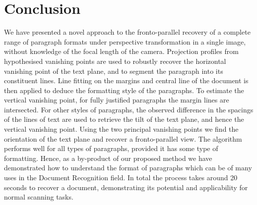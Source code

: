 \documentclass{elsart}   %
\begin{document}






\section{Conclusion} \label{conclusions}

We have presented a novel approach to the fronto-parallel recovery of a complete
range of  paragraph formats under perspective transformation in a
single image, without knowledge of the focal length of the camera.  Projection
profiles from hypothesised vanishing points are used to robustly recover the
horizontal vanishing point of the text plane, and to segment the paragraph into
its constituent lines.  Line fitting on the margins and central line of the
document is then applied to deduce the formatting style of the paragraphs.  To
estimate the vertical vanishing point, for fully justified paragraphs the margin
lines are intersected.  For other styles of paragraphs, the observed difference
in the spacings of the lines of text are used to retrieve the tilt of the text
plane, and hence the vertical vanishing point.  Using the two principal
vanishing points we find the orientation of the text plane and recover a
fronto-parallel view.  The algorithm performs well for all types of paragraphs,
provided it has some type of formatting. Hence, as a by-product of our proposed
method we have demonstrated how to understand the format of paragraphs which can 
be of many uses in the Document Recognition field.
In total the process takes around 20 seconds to recover a document,
demonstrating its potential and applicability 
for normal scanning tasks.

\end{document}
